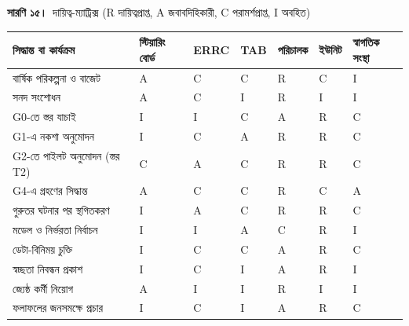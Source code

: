 \documentclass[border=10pt]{standalone}
\begin{document}
\begin{minipage}{22cm}
{\large\bfseries সারণি ১৫।}\ {\large দায়িত্ব-ম্যাট্রিক্স (R দায়িত্বপ্রাপ্ত, A জবাবদিহিকারী, C পরামর্শপ্রাপ্ত, I অবহিত)}\par\vspace{7pt}
\small
{}
\begin{tabularx}{\linewidth}{@{}>{\hsize=2.658\hsize\raggedright\arraybackslash}X>{\hsize=0.709\hsize\raggedright\arraybackslash}X>{\hsize=0.709\hsize\raggedright\arraybackslash}X>{\hsize=0.709\hsize\raggedright\arraybackslash}X>{\hsize=0.709\hsize\raggedright\arraybackslash}X>{\hsize=0.709\hsize\raggedright\arraybackslash}X>{\hsize=0.797\hsize\raggedright\arraybackslash}X@{}}
\arrayrulecolor{bapilrule}\toprule
\rowcolor{white}\textbf{সিদ্ধান্ত বা কার্যক্রম} & \textbf{স্টিয়ারিং বোর্ড} & \textbf{ERRC} & \textbf{TAB} & \textbf{পরিচালক} & \textbf{ইউনিট} & \textbf{স্বাগতিক সংস্থা} \\
\midrule
বার্ষিক পরিকল্পনা ও বাজেট & A & C & C & R & C & I \\
সনদ সংশোধন & A & C & I & R & I & I \\
G0-তে স্তর যাচাই & I & I & C & A & R & C \\
G1-এ নকশা অনুমোদন & I & C & A & R & R & C \\
G2-তে পাইলট অনুমোদন (স্তর T2) & C & A & C & R & R & C \\
G4-এ গ্রহণের সিদ্ধান্ত & A & C & C & R & C & A \\
গুরুতর ঘটনার পর স্থগিতকরণ & I & A & C & R & R & C \\
মডেল ও নির্ভরতা নির্বাচন & I & I & A & C & R & I \\
ডেটা-বিনিময় চুক্তি & I & C & C & A & R & C \\
স্বচ্ছতা নিবন্ধন প্রকাশ & I & C & I & A & R & I \\
জ্যেষ্ঠ কর্মী নিয়োগ & A & I & I & R & I & I \\
ফলাফলের জনসমক্ষে প্রচার & I & C & I & A & R & C \\
\bottomrule
\end{tabularx}
\par\vspace{5pt}{\footnotesize\itshape G4-এ স্টিয়ারিং বোর্ড ও স্বাগতিক সংস্থা যৌথভাবে জবাবদিহিকারী: পরিচালনাগত সিদ্ধান্তের মালিক সংস্থা। A দিয়ে BAPIL-এর অভ্যন্তরীণ জবাবদিহি বোঝানো হয়েছে; BAPIL-এর কোনো আইনগত সত্তা নেই বলে চুক্তি ও ডেটা-বিনিময় চুক্তি স্বাগতিক প্রতিষ্ঠান স্বাক্ষর করে।}
\par{}
\end{minipage}
\end{document}
